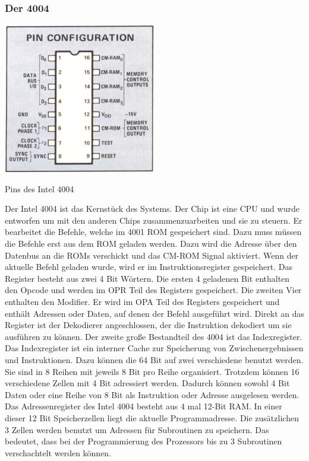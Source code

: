 \subsubsection{Der 4004}
 \begin{floatingfigure}[r]{.5\textwidth}
 	\vspace{-10pt}
 	\includegraphics[width=0.5\textwidth]{figures/pins_4004.png}
 	\caption{Pins des Intel 4004}
 	\label{fig:pins_4004}
 \end{floatingfigure}
Der Intel 4004 ist das Kernstück des Systems. Der Chip ist eine CPU und wurde entworfen um mit den anderen Chips zusammenzuarbeiten und sie zu steuern. Er bearbeitet die Befehle, welche im 4001 ROM gespeichert sind. Dazu muss müssen die Befehle erst aus dem ROM geladen werden.
Dazu wird die Adresse über den Datenbus an die ROMs verschickt und das CM-ROM Signal aktiviert. Wenn der aktuelle Befehl geladen wurde, wird er im Instruktionsregister gespeichert. Das Register besteht aus zwei 4 Bit Wörtern. Die ersten 4 geladenen Bit enthalten den Opcode und werden im OPR Teil des Registers gespeichert. Die zweiten Vier enthalten den Modifier. Er wird im OPA Teil des Registers gespeichert und enthält Adressen oder Daten, auf denen der Befehl ausgeführt wird. Direkt an das Register ist der Dekodierer angeschlossen, der die Instruktion dekodiert um sie ausführen zu können. Der zweite große Bestandteil des 4004 ist das Indexregister. Das Indexregister ist ein interner Cache zur Speicherung von Zwischenergebnissen und Instruktionen. Dazu können die 64 Bit auf zwei verschiedene benutzt werden. Sie sind in 8 Reihen mit jeweils 8 Bit pro Reihe organisiert. Trotzdem können 16 verschiedene Zellen mit 4 Bit adressiert werden. Dadurch können sowohl 4 Bit Daten oder eine Reihe von 8 Bit als Instruktion oder Adresse ausgelesen werden. Das Adressenregister des Intel 4004 besteht aus 4 mal 12-Bit RAM. In einer dieser 12 Bit Speicherzellen liegt die aktuelle Programmadresse. Die zusätzlichen 3 Zellen werden benutzt um Adressen für Subroutinen zu speichern. Das bedeutet, dass bei der Programmierung des Prozessors bis zu 3 Subroutinen verschachtelt werden können.
